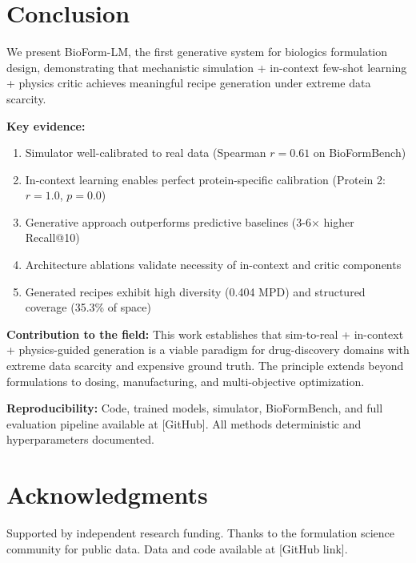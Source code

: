 \documentclass[11pt]{article}
\begin{document}
\section{Conclusion}

We present BioForm-LM, the first generative system for biologics formulation design, demonstrating that mechanistic simulation + in-context few-shot learning + physics critic achieves meaningful recipe generation under extreme data scarcity.

\textbf{Key evidence:}
\begin{enumerate}
    \item Simulator well-calibrated to real data (Spearman $r=0.61$ on BioFormBench)
    \item In-context learning enables perfect protein-specific calibration (Protein 2: $r=1.0$, $p=0.0$)
    \item Generative approach outperforms predictive baselines (3-6× higher Recall@10)
    \item Architecture ablations validate necessity of in-context and critic components
    \item Generated recipes exhibit high diversity (0.404 MPD) and structured coverage (35.3\% of space)
\end{enumerate}

\textbf{Contribution to the field:} This work establishes that sim-to-real + in-context + physics-guided generation is a viable paradigm for drug-discovery domains with extreme data scarcity and expensive ground truth. The principle extends beyond formulations to dosing, manufacturing, and multi-objective optimization.

\textbf{Reproducibility:} Code, trained models, simulator, BioFormBench, and full evaluation pipeline available at [GitHub]. All methods deterministic and hyperparameters documented.

\section*{Acknowledgments}

Supported by independent research funding. Thanks to the formulation science community for public data. Data and code available at [GitHub link].
\end{document}
